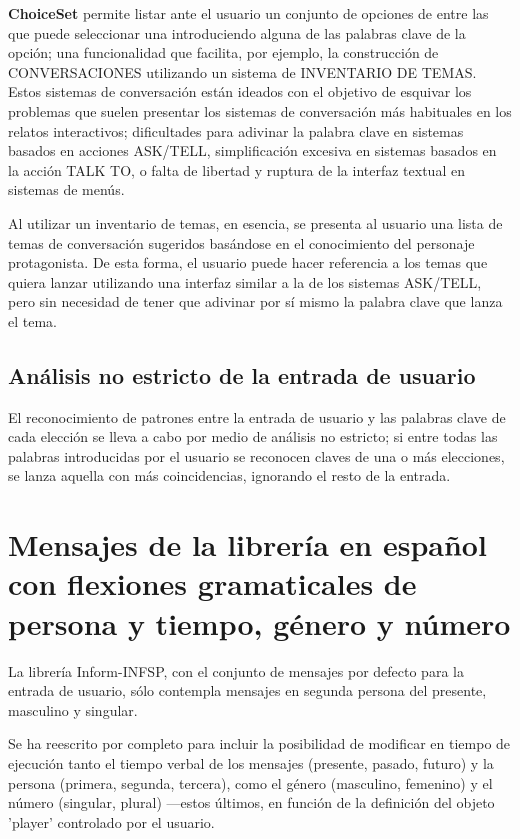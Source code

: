 \textbf{ChoiceSet} permite listar ante el usuario un conjunto de opciones de entre las que puede seleccionar una introduciendo alguna de las palabras clave de la opción; una funcionalidad que facilita, por ejemplo, la construcción de CONVERSACIONES utilizando un sistema de INVENTARIO DE TEMAS. Estos sistemas de conversación están ideados con el objetivo de esquivar los problemas que suelen presentar los sistemas de conversación más habituales en los relatos interactivos; dificultades para adivinar la palabra clave en sistemas basados en acciones ASK/TELL, simplificación excesiva en sistemas basados en la acción TALK TO, o falta de libertad y ruptura de la interfaz textual en sistemas de menús.

Al utilizar un inventario de temas, en esencia, se presenta al usuario una lista de temas de conversación sugeridos basándose en el conocimiento del personaje protagonista. De esta forma, el usuario puede hacer referencia a los temas que quiera lanzar utilizando una interfaz similar a la de los sistemas ASK/TELL, pero sin necesidad de tener que adivinar por sí mismo la palabra clave que lanza el tema.

\subsection{Análisis no estricto de la entrada de usuario}

El reconocimiento de patrones entre la entrada de usuario y las palabras clave de cada elección se lleva a cabo por medio de análisis no estricto; si entre todas las palabras introducidas por el usuario se reconocen claves de una o más elecciones, se lanza aquella con más coincidencias, ignorando el resto de la entrada.


\section{Mensajes de la librería en español con flexiones gramaticales de persona y tiempo, género y número}

La librería Inform-INFSP, con el conjunto de mensajes por defecto para la entrada de usuario, sólo contempla mensajes en segunda persona del presente, masculino y singular.

Se ha reescrito por completo para incluir la posibilidad de modificar en tiempo de ejecución tanto el tiempo verbal de los mensajes (presente, pasado, futuro) y la persona (primera, segunda, tercera), como el género (masculino, femenino) y el número (singular, plural) ---estos últimos, en función de la definición del objeto 'player' controlado por el usuario.

